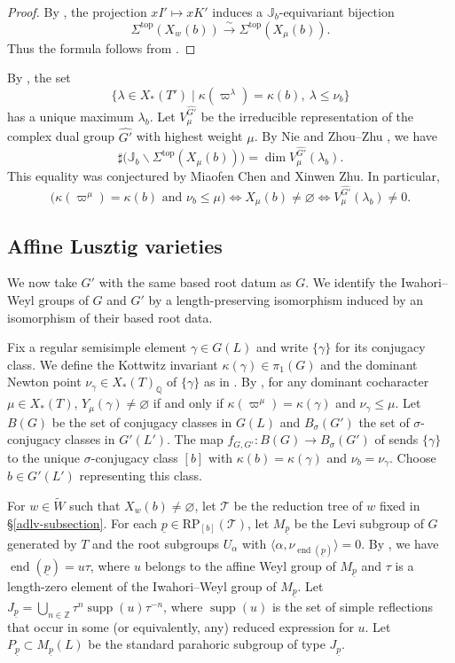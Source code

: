 \documentclass[12pt]{article}
\DeclareMathOperator{\en}{end}
\DeclareMathOperator{\supp}{supp}
\newcommand\Q{\mathbb Q}
\newcommand\J{\mathbb J}
\newcommand\tW{\tilde W}
\newcommand\tp{\mathrm{top}}
\newcommand\unp{\underline p}
\newcommand\vp{\varpi}
\theoremstyle{definition}
\begin{document}
\begin{proof}
By \cite[Proposition 2.4.10]{HZZ25}, the projection $xI'\mapsto xK'$ induces a $\J_b$-equivariant bijection
$$
\Sigma^{\tp}(X_w(b))\xrightarrow{\sim}\Sigma^{\tp}(X_\mu(b)).
$$
Thus the formula follows from \cite[Proposition 2.5]{He25}.
\end{proof}

By \cite[Lemma/Definition 2.1]{HV18}, the set
$$
\{\lambda\in X_*(T')\mid \kappa(\vp^\lambda)=\kappa(b),\ \lambda\le\nu_b\}
$$
has a unique maximum $\lambda_b$.
Let $V_\mu^{\widehat{G'}}$ be the irreducible representation of the complex dual group $\widehat{G'}$ with highest weight $\mu$.
By Nie \cite{Nie22} and Zhou--Zhu \cite{ZZ20}, we have
$$
\sharp\bigl(\J_b\backslash\Sigma^{\tp}(X_\mu(b))\bigr)=\dim V_\mu^{\widehat{G'}}(\lambda_b).
$$
This equality was conjectured by Miaofen Chen and Xinwen Zhu.
In particular,
$$
\bigl(\kappa(\vp^\mu)=\kappa(b)\text{ and }\nu_b\le\mu\bigr) \Longleftrightarrow X_\mu(b)\ne\varnothing \Longleftrightarrow V_\mu^{\widehat{G'}}(\lambda_b)\ne 0.
$$

\subsection{Affine Lusztig varieties}

We now take $G'$ with the same based root datum as $G$.
We identify the Iwahori--Weyl groups of $G$ and $G'$ by a length-preserving isomorphism induced by an isomorphism of their based root data.

Fix a regular semisimple element $\gamma\in G(L)$ and write $\{\gamma\}$ for its conjugacy class.
We define the Kottwitz invariant $\kappa(\gamma)\in\pi_1(G)$ and the dominant Newton point $\nu_\gamma\in X_*(T)_{\Q}$ of $\{\gamma\}$ as in \cite{KV12}.
By \cite[Theorem 6.9]{HeALV}, for any dominant cocharacter $\mu\in X_*(T)$, $Y_\mu(\gamma)\ne\varnothing$ if and only if $\kappa(\vp^\mu)=\kappa(\gamma)$ and $\nu_\gamma\le\mu$.
Let $B(G)$ be the set of conjugacy classes in $G(L)$ and $B_\sigma(G')$ the set of $\sigma$-conjugacy classes in $G'(L')$.
The map $f_{G,G'}\colon B(G)\longrightarrow B_\sigma(G')$ of \cite[\S1.2]{He25} sends $\{\gamma\}$ to the unique $\sigma$-conjugacy class $[b]$ with $\kappa(b)=\kappa(\gamma)$ and $\nu_b=\nu_\gamma$.
Choose $b\in G'(L')$ representing this class.

For $w\in\tW$ such that $X_w(b)\ne\varnothing$, let $\mathcal T$ be the reduction tree of $w$ fixed in \S\ref{adlv-subsection}.
For each $\unp\in\mathrm{RP}_{[b]}(\mathcal T)$, let $M_{\unp}$ be the Levi subgroup of $G$ generated by $T$ and the root subgroups $U_\alpha$ with $\langle\alpha,\nu_{\en(\unp)}\rangle=0$.
By \cite[\S4.2]{HeALV}, we have $\en(\unp)=u\tau$, where $u$ belongs to the affine Weyl group of $M_{\unp}$ and $\tau$ is a length-zero element of the Iwahori--Weyl group of $M_{\unp}$.
Let $J_{\unp}=\bigcup_{n\in\mathbb Z}\tau^n\supp(u)\tau^{-n}$, where $\supp(u)$ is the set of simple reflections that occur in some (or equivalently, any) reduced expression for $u$.
Let $P_{\unp}\subset M_{\unp}(L)$ be the standard parahoric subgroup of type $J_{\unp}$.
\end{document}
